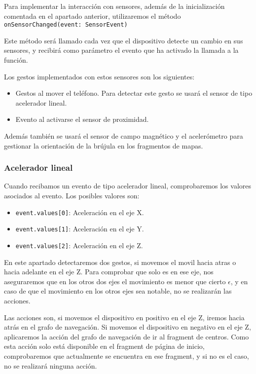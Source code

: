 Para implementar la interacción con sensores, además de la inicialización comentada en el apartado anterior, utilizaremos el método \texttt{onSensorChanged(event: SensorEvent)}

Este método será llamado cada vez que el dispositivo detecte un cambio en sus sensores, y recibirá como parámetro el evento que ha activado la llamada a la función.


Los gestos implementados con estos sensores son los siguientes:

\begin{itemize}
	\item Gestos al mover el teléfono. Para detectar este gesto se usará el sensor de tipo acelerador lineal.
	\item Evento al activarse el sensor de proximidad.
\end{itemize}

Además también se usará el sensor de campo magnético y el acelerómetro para gestionar la orientación de la brújula en los fragmentos de mapas.

\subsubsection{Acelerador lineal}

Cuando recibamos un evento de tipo acelerador lineal, comprobaremos los valores asociados al evento. Los posibles valores son:

\begin{itemize}
	\item \texttt{event.values[0]}: Aceleración en el eje X.
	\item \texttt{event.values[1]}: Aceleración en el eje Y.
	\item \texttt{event.values[2]}: Aceleración en el eje Z.
\end{itemize}

En este apartado detectaremos dos gestos, si movemos el movil hacia atras o hacia adelante en el eje Z. Para comprobar que solo es en ese eje, nos aseguraremos que en los otros dos ejes el movimiento es menor que cierto $\epsilon$, y en caso de que el movimiento en los otros ejes sea notable, no se realizarán las acciones.

Las acciones son, si movemos el dispositivo en positivo en el eje Z, iremos hacia atrás en el grafo de navegación. Si movemos el dispositivo en negativo en el eje Z, aplicaremos la acción del grafo de navegación de ir al fragment de centros. Como esta acción solo está disponible en el fragment de página de inicio, comprobaremos que actualmente se encuentra en ese fragment, y si no es el caso, no se realizará ninguna acción.

